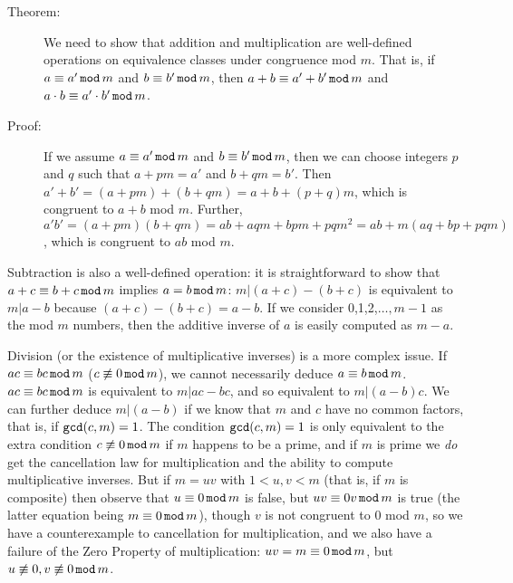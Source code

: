 \documentclass[12pt]{article}
\begin{document}
\begin{description}

\item[Theorem:]  We need to show that addition and multiplication are well-defined operations on equivalence classes under congruence mod $m$.
That is, if \newline $a \equiv a' \,{\tt mod}\,m$ and $b \equiv b' \,{\tt mod}\,m$, then $a+b \equiv a'+b' \,{\tt mod}\,m$ and $a\cdot b \equiv a'\cdot b' \,{\tt mod}\,m$.

\item[Proof:]   If we assume $a \equiv a' \,{\tt mod}\,m$ and $b \equiv b' \,{\tt mod}\,m$, then we can choose integers $p$ and $q$ such that $a+pm = a'$ and $b+qm=b'$.  Then $a'+b'=(a+pm)+(b+qm)=a+b + (p+q)m$, which is congruent to $a+b$ mod $m$.  Further, $a'b'=(a+pm)(b+qm)=ab + aqm + bpm + pqm^2 = ab + m(aq+bp+pqm)$, which is congruent to $ab$ mod $m$.


\end{description}

Subtraction is also a well-defined operation:  it is straightforward to show that $a+c \equiv b+c \,{\tt mod} \,m$
implies $a=b\,{\tt mod}\, m$:  $m|(a+c)-(b+c)$ is equivalent to $m|a-b$ because $(a+c)-(b+c)=a-b$.  If we consider
0,1,2,$\ldots,m-1$ as the mod $m$ numbers, then the additive inverse of $a$ is easily computed as $m-a$.

Division (or the existence of multiplicative inverses) is a more complex issue.  If $ac \equiv bc\,{\tt mod} \,m$ ($c \not\equiv 0\,{\tt mod}\,m$),
we cannot necessarily deduce $a\equiv b \,{\tt mod}\, m$.  $ac \equiv bc\,{\tt mod} \,m$ is equivalent to
$m|ac-bc$, and so equivalent to $m|(a-b)c$.  We can further deduce $m|(a-b)$ if we know that $m$ and $c$ have no common factors, that is, if ${\tt gcd}(c,m)=1$.   The condition ${\tt gcd}(c,m)=1$ is only equivalent to the extra condition $c \not\equiv 0\,{\tt mod}\,m$ if $m$ happens to be a prime, and if $m$ is prime we {\em do\/} get the cancellation law for multiplication and the ability to compute multiplicative inverses.  But if $m=uv$ with $1<u,v<m$ (that is, if $m$ is composite) then observe that $u \equiv 0 \,{\tt mod}\,m$ is false, but $uv \equiv 0v \,{\tt mod}\,m$ is 
true (the latter equation being $m \equiv 0 \,{\tt mod}\,m$), though $v$ is not congruent to 0 mod $m$, so we have a counterexample to cancellation for multiplication, and we also have a failure of the Zero Property of multiplication:  $uv = m \equiv 0\,{\tt mod}\,m$, but $u \not\equiv 0, v \not\equiv 0 \,{\tt mod}\,m$.
\end{document}
